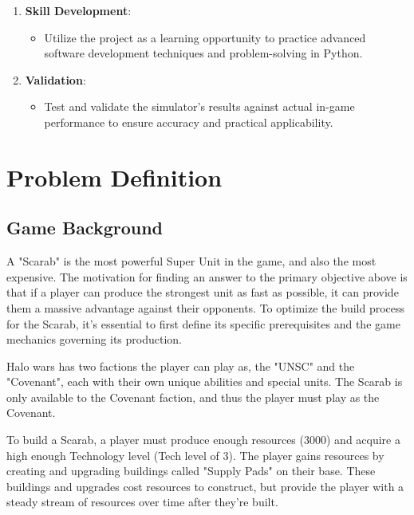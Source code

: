 \documentclass[a4paper, 12pt, english]{article}
\begin{document}
\begin{enumerate}
    \item \textbf{Skill Development}:
    \begin{itemize}
        \item Utilize the project as a learning opportunity to practice advanced software development techniques and problem-solving in Python.
    \end{itemize}

    \item \textbf{Validation}:
    \begin{itemize}
        \item Test and validate the simulator's results against actual in-game performance to ensure accuracy and practical applicability.
    \end{itemize}
\end{enumerate}


        
\section{Problem Definition}

		

\subsection{Game Background}
A "Scarab" is the most powerful Super Unit in the game, and also the most expensive. The motivation for finding an answer to the primary objective above is that if a player can produce the strongest unit as fast as possible, it can provide them a massive advantage against their opponents. To optimize the build process for the Scarab, it’s essential to first define its specific prerequisites and the game mechanics governing its production. 
\newline

Halo wars has two factions the player can play as, the "UNSC" and the "Covenant", each with their own unique abilities and special units. The Scarab is only available to the Covenant faction, and thus the player must play as the Covenant.
\newline

To build a Scarab, a player must produce enough resources (3000) and acquire a high enough Technology level (Tech level of 3).
The player gains resources by creating and upgrading buildings called "Supply Pads" on their base. These buildings and upgrades cost resources to construct, but provide the player with a steady stream of resources over time after they're built. 
\newline
\end{document}
